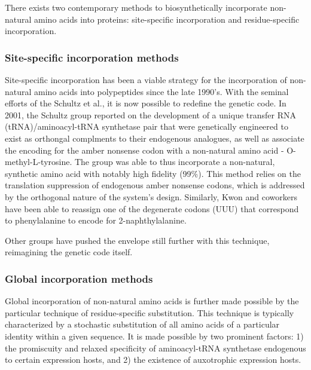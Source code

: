 \begin{refsection}
There exists two contemporary methods to biosynthetically incorporate
non-natural amino acids into proteins: site-specific incorporation and
residue-specific incorporation.

\subsubsection{Site-specific incorporation methods} 


Site-specific incorporation has been a viable strategy for the incorporation of
non-natural amino acids into polypeptides since the late 1990's. With the
seminal efforts of the Schultz et al., it is now possible to redefine the
genetic code. In 2001, the Schultz group reported on the development of a unique
transfer RNA (tRNA)/aminoacyl-tRNA synthetase pair that were genetically
engineered to exist as orthongal complments to their endogenous analogues, as
well as associate the encoding for the amber nonsense codon with a non-natural
amino acid - O-methyl-L-tyrosine. The group was able to thus incorporate a
non-natural, synthetic amino acid with notably high fidelity
(99\%).\cite{Wang2001} This method relies on the translation suppression of
endogenous amber nonsense codons, which is addressed by the orthogonal nature of
the system's design. Similarly, Kwon and coworkers have been able to reassign
one of the degenerate codons (UUU) that correspond to phenylalanine to encode
for 2-naphthylalanine.\cite{Kwon2003}

Other groups have pushed the envelope still further with this technique,
reimagining the genetic code itself.

\subsubsection{Global incorporation methods} 


Global incorporation of non-natural amino acids is further made possible by the
particular technique of residue-specific substitution. This technique is
typically characterized by a stochastic substitution of all amino acids of a
particular identity within a given sequence. It is made possible by two
prominent factors: 1) the promiscuity and relaxed specificity of aminoacyl-tRNA
synthetase endogenous to certain expression hosts, and 2) the existence of
auxotrophic expression hosts.


\end{refsection}
